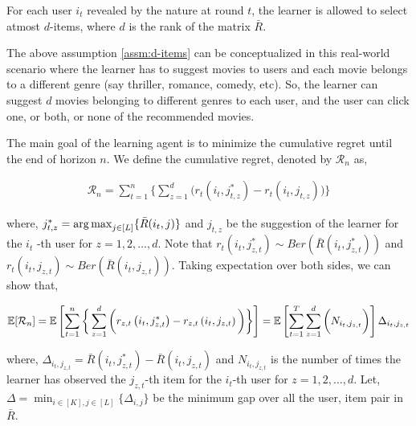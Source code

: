 
\begin{assumption}
\label{assm:d-items}
For each user $i_t$ revealed by the nature at round $t$, the learner is allowed to select atmost $d$-items, where $d$ is the rank of the matrix $\bar{R}$.
\end{assumption}

The above assumption \ref{assm:d-items} can be conceptualized in this real-world scenario where the learner has  to suggest movies to users and each movie belongs to a different genre (say thriller, romance, comedy, etc). So, the learner can suggest $d$ movies belonging to different genres to each user, and the user can click one, or both, or none of the recommended movies.


The main goal of the learning agent is to minimize the cumulative regret until the end of horizon $n$. We define the cumulative regret, denoted by $\mathcal{R}_n$ as,

\begin{align*}
\mathcal{R}_n = \sum_{t=1}^{n}\bigg\lbrace \sum_{z=1}^{d} \bigg( r_{t}\left(i_{t}, j^*_{t,z} \right) - r_{t}\left( i_{t}, j_{t,z}\right)\bigg)\bigg\rbrace
\end{align*}

where, $j^*_{t,z} = \mathop{\rm arg\,max}_{j\in [L]}\lbrace \bar{R}(i_t,j)\rbrace$ and $j_{t,z}$ be the suggestion of the learner for the $i_t$ -th user for  $z=1,2,\ldots, d$. Note that $r_{t}\left(i_t, j^*_{z,t} \right)\sim Ber(\bar{R}\left(i_t, j^*_{z,t} \right))$ and $r_{t}\left(i_t, j_{z,t} \right)\sim Ber(\bar{R}\left(i_t, j_{z,t} \right))$. Taking expectation over both sides, we can show that,

\begin{align*}
\mathbb{E}[\mathcal{R}_n] = \mathbb{E}\left [ \sum_{t=1}^{n}\bigg\lbrace\sum_{z=1}^{d} \bigg( r_{z,t}\left(i_t, j^*_{z,t} \right) - r_{z, t}\left( i_t, j_{z, t}\right)\bigg)\bigg\rbrace\right] = \mathbb{E}\left [ \sum_{t=1}^{T} \sum_{z=1}^{d} \bigg( N_{i_t,j_{z,t}}\bigg) \right ]\Delta_{i_t,j_{z,t}}
\end{align*}

where, $\Delta_{i_t,j_{z,t}} = \bar{R}(i_t,j^*_{z,t}) - \bar{R}(i_t,j_{z,t})$ and $N_{i_t,j_{z,t}}$ is the number of times the learner has observed the $j_{z,t}$-th item for the $i_t$-th user for $z=1,2,\ldots, d$. Let, $\Delta = \min_{i\in[K],j\in[L]}\lbrace \Delta_{i,j}\rbrace$ be the minimum gap over all the user, item pair in $\bar{R}$.
